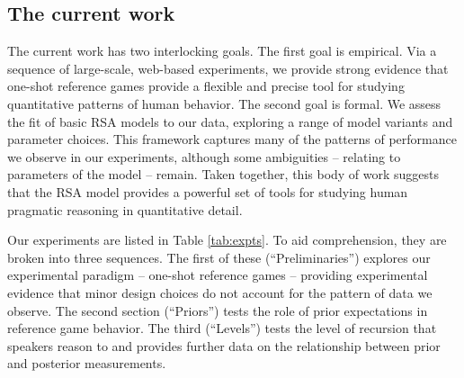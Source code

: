 \documentclass[man,noapacite]{apa2}
\begin{document}
\subsection{The current work}

The current work has two interlocking goals. The first goal is empirical. Via a sequence of large-scale, web-based experiments, we provide strong evidence that one-shot reference games provide a flexible and precise tool for studying quantitative patterns of human behavior. The second goal is formal. We assess the fit of basic RSA models to our data, exploring a range of model variants and parameter choices. This framework captures many of the patterns of performance we observe in our experiments, although some ambiguities -- relating to parameters of the model -- remain. Taken together, this body of work suggests that the RSA model provides a powerful set of tools for studying human pragmatic reasoning in quantitative detail.

Our experiments are listed in Table \ref{tab:expts}. To aid comprehension, they are broken into three sequences. The first of these (``Preliminaries'') explores our experimental paradigm -- one-shot reference games -- providing experimental evidence that minor design choices do not account for the pattern of data we observe. The second section (``Priors'') tests the role of prior expectations in reference game behavior. The third (``Levels'') tests the level of recursion that speakers reason to and provides further data on the relationship between prior and posterior measurements.
\end{document}
